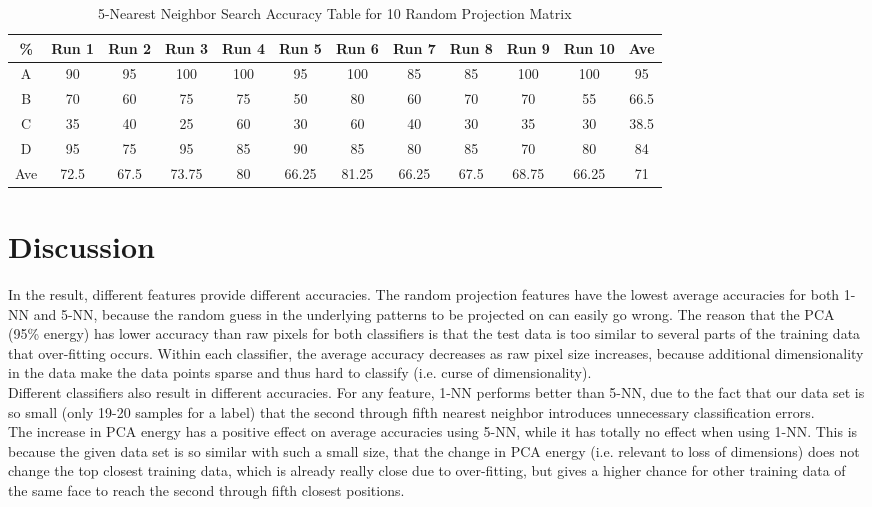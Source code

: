 \documentclass{article}
\begin{document}
\begin{table}[H]
	\centering
	\caption{5-Nearest Neighbor Search Accuracy Table for 10 Random Projection Matrix}
	\label{tab:5nn_rand}
	\begin{tabular}{|c|c|c|c|c|c|c|c|c|c|c|c|}
		\hline
		\%  & Run 1 & Run 2 & Run 3 & Run 4 & Run 5 & Run 6 & Run 7 & Run 8 & Run 9 & Run 10 & Ave  \\ \hline
		A   & 90    & 95    & 100   & 100   & 95    & 100   & 85    & 85    & 100   & 100    & 95   \\ \hline
		B   & 70    & 60    & 75    & 75    & 50    & 80    & 60    & 70    & 70    & 55     & 66.5 \\ \hline
		C   & 35    & 40    & 25    & 60    & 30    & 60    & 40    & 30    & 35    & 30     & 38.5 \\ \hline
		D   & 95    & 75    & 95    & 85    & 90    & 85    & 80    & 85    & 70    & 80     & 84   \\ \hline
		Ave & 72.5  & 67.5  & 73.75 & 80    & 66.25 & 81.25 & 66.25 & 67.5  & 68.75 & 66.25  & 71   \\ \hline
	\end{tabular}
\end{table}

\section{Discussion}
In the result, different features provide different accuracies. The random projection features have the lowest average accuracies for both 1-NN and 5-NN, because the random guess in the underlying patterns to be projected on can easily go wrong. The reason that the PCA (95\% energy) has lower accuracy than raw pixels for both classifiers is that the test data is too similar to several parts of the training data that over-fitting occurs. Within each classifier, the average accuracy decreases as raw pixel size increases, because additional dimensionality in the data make the data points sparse and thus hard to classify (i.e. curse of dimensionality).\\
Different classifiers also result in different accuracies. For any feature, 1-NN performs better than 5-NN, due to the fact that our data set is so small (only 19-20 samples for a label) that the second through fifth nearest neighbor introduces unnecessary classification errors.\\
The increase in PCA energy has a positive effect on average accuracies using 5-NN, while it has totally no effect when using 1-NN. This is because the given data set is so similar with such a small size, that the change in PCA energy (i.e. relevant to loss of dimensions) does not change the top closest training data, which is already really close due to over-fitting, but gives a higher chance for other training data of the same face to reach the second through fifth closest positions.

		
		
\end{document}
